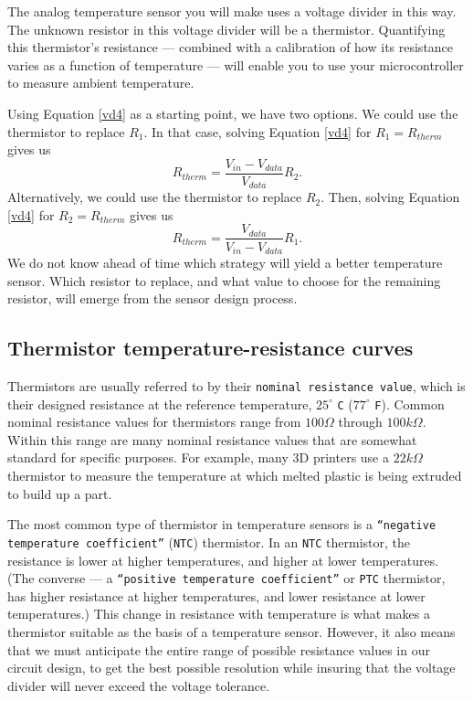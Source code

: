 The analog temperature sensor you will make uses a voltage divider in this way. 
The unknown resistor in this voltage divider will be a thermistor.
Quantifying this thermistor's resistance --- combined with a calibration of how its resistance varies as a function of temperature --- will enable you to use your microcontroller to measure ambient temperature.

Using Equation \ref{vd4} as a starting point, we have two options.
We could use the thermistor to replace $R_1$.
In that case, solving Equation \ref{vd4} for $R_1 = R_{therm}$ gives us 
\begin{equation}\label{therm1}
R_{therm} = \frac{V_{in}-V_{data}}{V_{data}}R_2.
\end{equation}
Alternatively, we could use the thermistor to replace $R_2$.
Then, solving Equation \ref{vd4} for $R_2 = R_{therm}$ gives us 
\begin{equation}\label{therm2}
R_{therm} = \frac{V_{data}}{V_{in}-V_{data}}R_1.
\end{equation}
We do not know ahead of time which strategy will yield a better temperature sensor.
Which resistor to replace, and what value to choose for the remaining resistor, will emerge from the sensor design process.

\subsection{Thermistor temperature-resistance curves}
Thermistors are usually referred to by their \texttt{nominal resistance value}, which is their designed resistance at the reference temperature, $25^\circ$ \texttt{C} ($77^\circ$ \texttt{F}).
Common nominal resistance values for thermistors range from $100\Omega$ through $100k\Omega$.
Within this range are many nominal resistance values that are somewhat standard for specific purposes.
For example, many 3D printers use a $22k\Omega$ thermistor to measure the temperature at which melted plastic is being extruded to build up a part. 

The most common type of thermistor in temperature sensors is a \texttt{``negative temperature coefficient''} (\texttt{NTC}) thermistor.
In an \texttt{NTC} thermistor, the resistance is lower at higher temperatures, and higher at lower temperatures.
(The converse --- a \texttt{``positive temperature coefficient''} or \texttt{PTC} thermistor, has higher resistance at higher temperatures, and lower resistance at lower temperatures.)
This change in resistance with temperature is what makes a thermistor suitable as the basis of a temperature sensor. 
However, it also means that we must anticipate the entire range of possible resistance values in our circuit design, to get the best possible resolution while insuring that the voltage divider will never exceed the \adc voltage tolerance.

